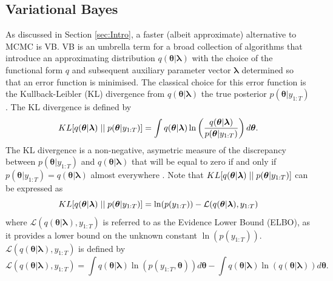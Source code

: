 \documentclass[12pt,a4paper]{article}%
\numberwithin{equation}{section}
\begin{document}
\subsection{Variational Bayes} \label{sec:VB}

As discussed in Section \ref{sec:Intro}, a faster (albeit approximate) alternative to MCMC is VB. VB is an umbrella term for a broad collection of algorithms that introduce an approximating distribution $q(\boldsymbol{\theta} | \boldsymbol{\lambda})$ with the choice of the functional form $q$ and subsequent auxiliary parameter vector $\boldsymbol{\lambda}$ determined so that an error function is minimised. The classical choice for this error function is the Kullback-Leibler (KL) divergence \citep{Kullback1951} from $q(\boldsymbol{\theta} | \boldsymbol{\lambda})$ the true posterior $p(\boldsymbol{\theta} | y_{1:T})$. The KL divergence is defined by
\begin{equation}
\label{KL-def}
KL[q(\boldsymbol{\theta} | \boldsymbol{\lambda})\hspace{.1cm}||\hspace{.1cm}p(\boldsymbol{\theta} | y_{1:T})] = \int q(\boldsymbol{\theta} | \boldsymbol{\lambda}) \ln \left( \frac{q(\boldsymbol{\theta} | \boldsymbol{\lambda})}{p(\boldsymbol{\theta} |y_{1:T})}\right) d\boldsymbol{\theta}.
\end{equation}
The KL divergence is a non-negative, asymetric measure of the discrepancy between $p(\boldsymbol{\theta} | y_{1:T})$ and $q(\boldsymbol{\theta} | \boldsymbol{\lambda})$  that will be equal to zero if and only if $p(\boldsymbol{\theta} | y_{1:T}) = q(\boldsymbol{\theta} | \boldsymbol{\lambda})$ almost everywhere \citep{Bishop2006}. Note that $KL[q(\boldsymbol{\theta} | \boldsymbol{\lambda})\hspace{.1cm}||\hspace{.1cm}p(\boldsymbol{\theta} | y_{1:T})]$ can be expressed as
\begin{equation}
\label{KL-ELBO}
KL[q(\boldsymbol{\theta} | \boldsymbol{\lambda})\hspace{.1cm}||\hspace{.1cm}p(\boldsymbol{\theta} | y_{1:T})] = \ln(p(y_{1:T})) - \mathcal{L}(q(\boldsymbol{\theta} | \boldsymbol{\lambda}), y_{1:T})
\end{equation}
where $\mathcal{L}(q(\boldsymbol{\theta} | \boldsymbol{\lambda}), y_{1:T})$ is referred to as the Evidence Lower Bound (ELBO), as it provides a lower bound on the unknown constant $\ln(p(y_{1:T}))$.  $\mathcal{L}(q(\boldsymbol{\theta} | \boldsymbol{\lambda}), y_{1:T})$ is defined by
\begin{equation}
\label{ELBO}
\mathcal{L}(q(\boldsymbol{\theta} | \boldsymbol{\lambda}), y_{1:T}) = \int q(\boldsymbol{\theta} | \boldsymbol{\lambda}) \ln (p(y_{1:T},\boldsymbol{\theta})) d\boldsymbol{\theta} -  \int q(\boldsymbol{\theta} | \boldsymbol{\lambda}) \ln (q(\boldsymbol{\theta} | \boldsymbol{\lambda})) d\boldsymbol{\theta}.
\end{equation}
\end{document}
